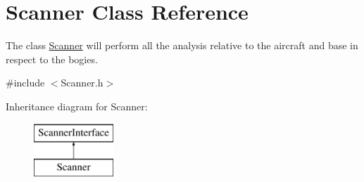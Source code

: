 \hypertarget{classScanner}{}\section{Scanner Class Reference}
\label{classScanner}


The class \hyperlink{classScanner}{Scanner} will perform all the analysis relative to the aircraft and base in respect to the bogies.  




{\ttfamily \#include $<$Scanner.\+h$>$}

Inheritance diagram for Scanner\+:\begin{figure}[H]
\begin{center}
\leavevmode
\includegraphics[height=2.000000cm]{classScanner}
\end{center}
\end{figure}
